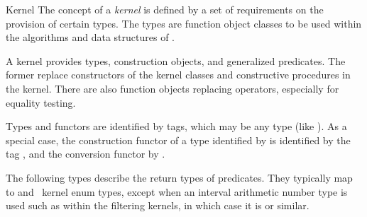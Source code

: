 \begin{ccRefConcept}{Kernel}
The concept of a {\em kernel} is defined by a set of requirements on
the provision of certain types.  The types are function object classes to be
used within the algorithms and data structures of \cgal.

A kernel provides types, construction objects, and generalized predicates.
The former replace constructors of the kernel classes and constructive
procedures in the kernel. There are also function objects replacing operators,
especially for equality testing.

Types and functors are identified by tags, which may be any type (like ). As a special case, the construction functor of a type identified by  is identified by the tag , and the conversion functor by .

\ccTypes

\ccGlue
{}

The following types describe the return types of predicates.  They typically
map to  and \cgal\ kernel enum types, except when an interval arithmetic
number type is used such as within the filtering kernels, in which case it is
 or similar.

\ccGlue
{}
\ccGlue
{}
\ccGlue
{}
\ccGlue
{}
\ccGlue
{}
\ccGlue
{}




\end{ccRefConcept}

